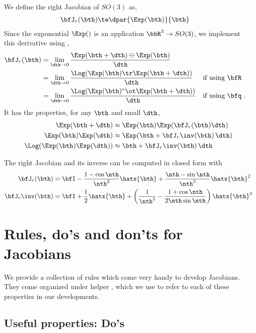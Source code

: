 We define the right Jacobian of $SO(3)$ as, 
%
\begin{align}
\bfJ_r(\bth) &\te \dpar{\Exp(\bth)}{\bth} 
\end{align}
%
Since the exponential $\Exp()$ is an application $\bbR^3\to SO(3)$,
we implement this derivative using ,
%
\begin{align}
\bfJ_r(\bth) &= \lim_{\dth\to0}\frac{\Exp(\bth+\dth)\ominus\Exp(\bth)}{\dth} \\
 &= \lim_{\dth\to0}\frac{\Log(\Exp(\bth)\tr\Exp(\bth+\dth))}{\dth} && \textrm{if using $\bfR$} \\
 &= \lim_{\dth\to0}\frac{\Log(\Exp(\bth)^*\ot\Exp(\bth+\dth))}{\dth} && \textrm{if using $\bfq$} 
 ~.
\end{align}
%
It has the properties, for any $\bth$ and small $\dth$,
%
\begin{align}
\Exp(\bth+\dth) &\approx \Exp(\bth)\Exp(\bfJ_r(\bth)\dth) \\
\Exp(\bth)\Exp(\dth) &\approx \Exp(\bth+\bfJ_r\inv(\bth)\,\dth) \\
\Log(\Exp(\bth)\Exp(\dth)) &\approx \bth+\bfJ_r\inv(\bth)\,\dth 
\end{align}

The right Jacobian and its inverse can be computed in closed form with
%
\begin{align}
\bfJ_r(\bth) &= \bfI - \frac{1-\cos\nth}{\nth^2}\hatx{\bth} + \frac{\nth-\sin\nth}{\nth^3}\hatx{\bth}^2 \\
\bfJ_r\inv(\bth) &= \bfI + \frac12\hatx{\bth} + \left(\frac1{\nth^2} - \frac{1+\cos\nth}{2\nth\sin\nth}\right)\hatx{\bth}^2
\end{align}






\section{Rules, do's and don'ts for Jacobians}
\label{sec:DosDonts}

We provide a collection of rules which come very handy to develop Jacobians. They come organized under helper \!\!\!\!, which we use to refer to each of these properties in our developments.

\subsection{Useful properties: Do's}

